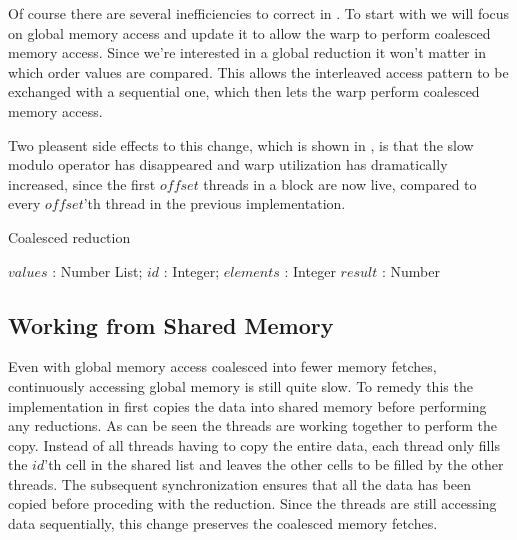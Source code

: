 Of course there are several inefficiencies to correct in
. To start with we will focus on global memory access
and update it to allow the warp to perform coalesced memory access. Since we're
interested in a global reduction it won't matter in which order values are
compared. This allows the interleaved access pattern to be exchanged with a
sequential one, which then lets the warp perform coalesced memory access.


Two pleasent side effects to this change, which is shown in
, is that the slow modulo operator has disappeared
and warp utilization has dramatically increased, since the first $offset$
threads in a block are now live, compared to every $offset$'th thread in the
previous implementation.

\begin{algorithm}
  \caption{Coalesced reduction}
  \label{alg:coalescedReduct}
  \begin{algorithmic}
              {$values$ : Number List; $id$ : Integer; $elements$ : Integer}
              {$result$ : Number}
              {
                  \ENDIF
                  \SYNC
                \ENDWHILE
                \ENDIF
              }
  \end{algorithmic}
\end{algorithm}



\subsection{Working from Shared Memory}\label{sec:usingSharedMem}

Even with global memory access coalesced into fewer memory fetches, continuously
accessing global memory is still quite slow. To remedy this the implementation
in  first copies the data into shared memory before
performing any reductions. As can be seen the threads are working together to
perform the copy. Instead of all threads having to copy the entire data, each
thread only fills the $id$'th cell in the shared list and leaves the other cells
to be filled by the other threads. The subsequent synchronization ensures that
all the data has been copied before proceding with the reduction. Since the
threads are still accessing data sequentially, this change preserves the
coalesced memory fetches.

